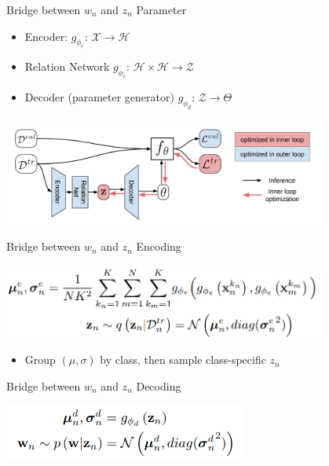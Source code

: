 \documentclass{beamer}
\begin{document}
\begin{frame}{Bridge between $w_n$ and $z_n$}
Parameter
\begin{itemize}
  \item Encoder: $g_{\phi_e}$: $\mathcal{X} \rightarrow \mathcal{H}$
  \item Relation Network $g_{\phi_r}$: $\mathcal{H} \times \mathcal{H} \rightarrow \mathcal{Z}$
  \item Decoder (parameter generator) $g_{\phi_d}$: $\mathcal{Z} \rightarrow \Theta$
\end{itemize}
  \center \includegraphics[width=0.8\textwidth]{fig/LEO-struct.png}
\end{frame}

\begin{frame}{Bridge between $w_n$ and $z_n$}
  Encoding
  \begin{center}
    \includegraphics[width=0.8\textwidth]{fig/LEO-encoding.png}
  \end{center}

  \begin{itemize}
    \item Group $(\mu, \sigma)$ by class, then sample class-specific $z_n$
  \end{itemize}

\end{frame}

\begin{frame}{Bridge between $w_n$ and $z_n$}
  Decoding
  \begin{center}
  \includegraphics[width=0.6\textwidth]{fig/LEO-decoding.png}
  \end{center}
\end{frame}
\end{document}
